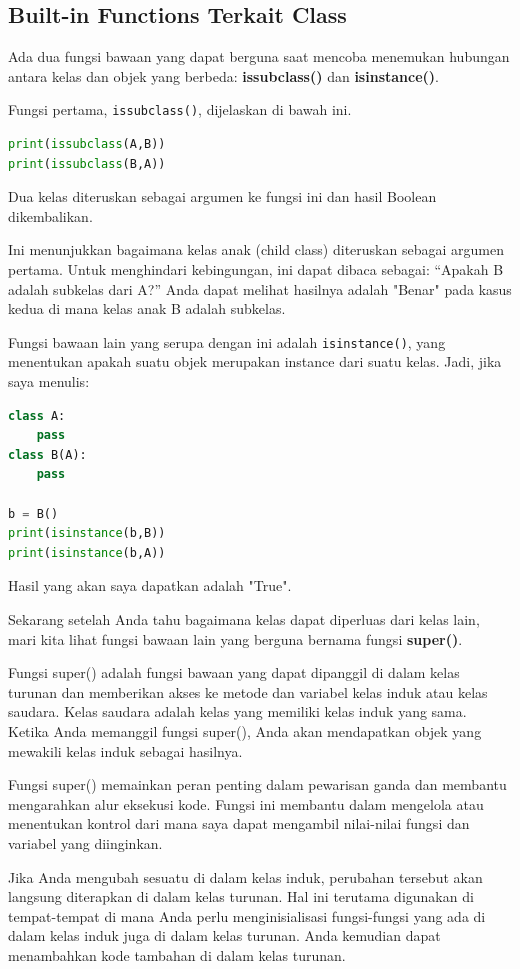 \documentclass{article}
\begin{document}
\subsection{Built-in Functions Terkait Class}
Ada dua fungsi bawaan yang dapat berguna saat mencoba menemukan hubungan antara kelas dan objek yang berbeda: \textbf{issubclass()} dan \textbf{isinstance()}.

Fungsi pertama, \verb|issubclass()|, dijelaskan di bawah ini.
\begin{lstlisting}[language=Python, caption={}, captionpos=b]
print(issubclass(A,B))
print(issubclass(B,A))
\end{lstlisting}
Dua kelas diteruskan sebagai argumen ke fungsi ini dan hasil Boolean dikembalikan.

Ini menunjukkan bagaimana kelas anak (child class) diteruskan sebagai argumen pertama. Untuk menghindari kebingungan, ini dapat dibaca sebagai: “Apakah B adalah subkelas dari A?” Anda dapat melihat hasilnya adalah "Benar" pada kasus kedua di mana kelas anak B adalah subkelas.

Fungsi bawaan lain yang serupa dengan ini adalah \verb|isinstance()|, yang menentukan apakah suatu objek merupakan instance dari suatu kelas. Jadi, jika saya menulis:
\begin{lstlisting}[language=Python, caption={}, captionpos=b]
class A:
	pass
class B(A):
	pass

b = B()
print(isinstance(b,B))
print(isinstance(b,A))
\end{lstlisting}
Hasil yang akan saya dapatkan adalah "True".

Sekarang setelah Anda tahu bagaimana kelas dapat diperluas dari kelas lain, mari kita lihat fungsi bawaan lain yang berguna bernama fungsi \textbf{super()}.

Fungsi super() adalah fungsi bawaan yang dapat dipanggil di dalam kelas turunan dan memberikan akses ke metode dan variabel kelas induk atau kelas saudara. Kelas saudara adalah kelas yang memiliki kelas induk yang sama. Ketika Anda memanggil fungsi super(), Anda akan mendapatkan objek yang mewakili kelas induk sebagai hasilnya.

Fungsi super() memainkan peran penting dalam pewarisan ganda dan membantu mengarahkan alur eksekusi kode. Fungsi ini membantu dalam mengelola atau menentukan kontrol dari mana saya dapat mengambil nilai-nilai fungsi dan variabel yang diinginkan.

Jika Anda mengubah sesuatu di dalam kelas induk, perubahan tersebut akan langsung diterapkan di dalam kelas turunan. Hal ini terutama digunakan di tempat-tempat di mana Anda perlu menginisialisasi fungsi-fungsi yang ada di dalam kelas induk juga di dalam kelas turunan. Anda kemudian dapat menambahkan kode tambahan di dalam kelas turunan.
\end{document}
